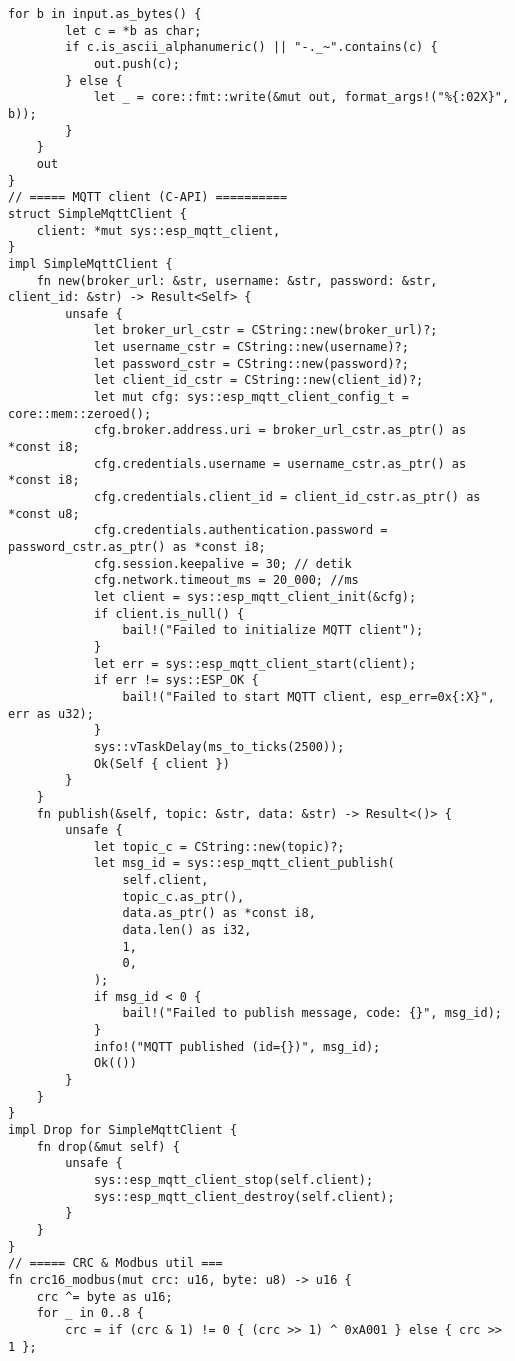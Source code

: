 \documentclass[a4paper, 12pt]{article}
\begin{document}
\begin{lstlisting}[style=ruststyle, caption={main.rs}, basicstyle=\ttfamily\tiny]
    for b in input.as_bytes() {
        let c = *b as char;
        if c.is_ascii_alphanumeric() || "-._~".contains(c) {
            out.push(c);
        } else {
            let _ = core::fmt::write(&mut out, format_args!("%{:02X}", b));
        }
    }
    out
}
// ===== MQTT client (C-API) ==========
struct SimpleMqttClient {
    client: *mut sys::esp_mqtt_client,
}
impl SimpleMqttClient {
    fn new(broker_url: &str, username: &str, password: &str, client_id: &str) -> Result<Self> {
        unsafe {
            let broker_url_cstr = CString::new(broker_url)?;
            let username_cstr = CString::new(username)?;
            let password_cstr = CString::new(password)?;
            let client_id_cstr = CString::new(client_id)?;
            let mut cfg: sys::esp_mqtt_client_config_t = core::mem::zeroed();
            cfg.broker.address.uri = broker_url_cstr.as_ptr() as *const i8;
            cfg.credentials.username = username_cstr.as_ptr() as *const i8;
            cfg.credentials.client_id = client_id_cstr.as_ptr() as *const u8;
            cfg.credentials.authentication.password = password_cstr.as_ptr() as *const i8;
            cfg.session.keepalive = 30; // detik
            cfg.network.timeout_ms = 20_000; //ms
            let client = sys::esp_mqtt_client_init(&cfg);
            if client.is_null() {
                bail!("Failed to initialize MQTT client");
            }
            let err = sys::esp_mqtt_client_start(client);
            if err != sys::ESP_OK {
                bail!("Failed to start MQTT client, esp_err=0x{:X}", err as u32);
            }
            sys::vTaskDelay(ms_to_ticks(2500));
            Ok(Self { client })
        }
    }
    fn publish(&self, topic: &str, data: &str) -> Result<()> {
        unsafe {
            let topic_c = CString::new(topic)?;
            let msg_id = sys::esp_mqtt_client_publish(
                self.client,
                topic_c.as_ptr(),
                data.as_ptr() as *const i8,
                data.len() as i32,
                1,
                0,
            );
            if msg_id < 0 {
                bail!("Failed to publish message, code: {}", msg_id);
            }
            info!("MQTT published (id={})", msg_id);
            Ok(())
        }
    }
}
impl Drop for SimpleMqttClient {
    fn drop(&mut self) {
        unsafe {
            sys::esp_mqtt_client_stop(self.client);
            sys::esp_mqtt_client_destroy(self.client);
        }
    }
}
// ===== CRC & Modbus util ===
fn crc16_modbus(mut crc: u16, byte: u8) -> u16 {
    crc ^= byte as u16;
    for _ in 0..8 {
        crc = if (crc & 1) != 0 { (crc >> 1) ^ 0xA001 } else { crc >> 1 };

\end{lstlisting}
\end{document}
